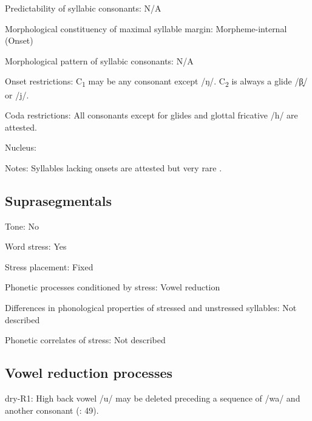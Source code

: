 {\begin{appendixdesc}
\item[Predictability of syllabic consonants:] N/A

\item[Morphological constituency of maximal syllable margin:] Morpheme-internal (Onset)

\item[Morphological pattern of syllabic consonants:] N/A

\item[Onset restrictions:] C\textsubscript{1} may be any consonant except /ŋ/. C\textsubscript{2} is always a glide /β̞/ or /j/.

\item[Coda restrictions:] All consonants except for glides and glottal fricative /h/ are attested.

\item[Nucleus:]

\item[Notes:] Syllables lacking onsets are attested but very rare \citep[19]{Dhakal2012}.
\end{appendixdesc}
\subsection*{Suprasegmentals}
\begin{appendixdesc}
\item[Tone:] No

\item[Word stress:] Yes

\item[Stress placement:] Fixed

\item[Phonetic processes conditioned by stress:] Vowel reduction

\item[Differences in phonological properties of stressed and unstressed syllables:] Not described

\item[Phonetic correlates of stress:] Not described
\end{appendixdesc}
\subsection*{Vowel reduction processes}
\begin{appendixdesc}

\item[dry-R1:] High back vowel /u/ may be deleted preceding a sequence of /wa/ and another consonant (\citealt{KotapishKotapish1973}: 49).
\end{appendixdesc}
}
